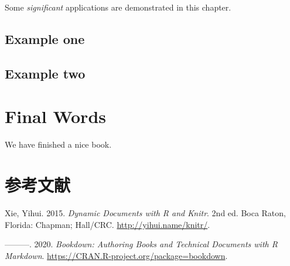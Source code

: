 \documentclass[
  cn,11pt,chinese,bibstyle=apalike]{elegantbook}
\newlength{\cslhangindent}
\newenvironment{cslreferences}%
  {\setlength{\parindent}{0pt}%
  \everypar{\setlength{\hangindent}{\cslhangindent}}\ignorespaces}%
  {\par}
\begin{document}
Some \emph{significant} applications are demonstrated in this chapter.

\hypertarget{example-one}{%
\section{Example one}\label{example-one}}

\hypertarget{example-two}{%
\section{Example two}\label{example-two}}

\hypertarget{final-words}{%
\chapter{Final Words}\label{final-words}}

We have finished a nice book.

\hypertarget{References}{%
\chapter*{参考文献}\label{References}}

\hypertarget{refs}{}
\begin{cslreferences}
\leavevmode\hypertarget{ref-xie2015}{}%
Xie, Yihui. 2015. \emph{Dynamic Documents with R and Knitr}. 2nd ed. Boca Raton, Florida: Chapman; Hall/CRC. \url{http://yihui.name/knitr/}.

\leavevmode\hypertarget{ref-R-bookdown}{}%
---------. 2020. \emph{Bookdown: Authoring Books and Technical Documents with R Markdown}. \url{https://CRAN.R-project.org/package=bookdown}.
\end{cslreferences}
\end{document}

